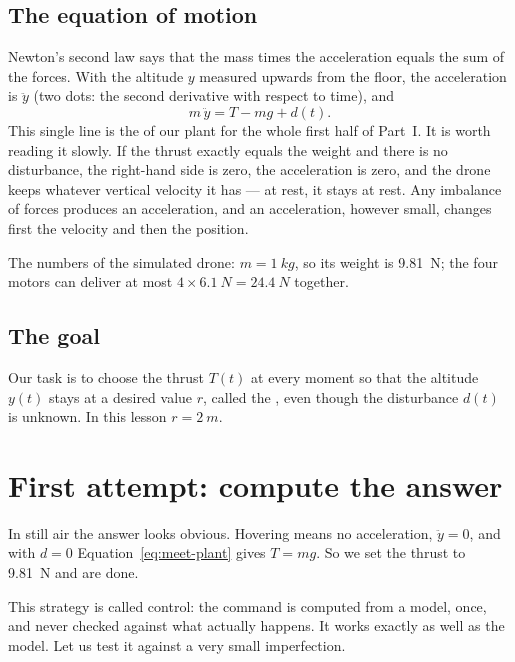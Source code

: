 \subsection{The equation of motion}
Newton's second law says that the mass times the acceleration equals the sum of the forces. With the altitude $y$ measured upwards from the floor, the acceleration is $\ddot y$ (two dots: the second derivative with respect to time), and
\begin{equation}\label{eq:meet-plant}
  m\,\ddot y = T - m g + d(t).
\end{equation}
This single line is the  of our plant for the whole first half of Part~I. It is worth reading it slowly. If the thrust exactly equals the weight and there is no disturbance, the right-hand side is zero, the acceleration is zero, and the drone keeps whatever vertical velocity it has — at rest, it stays at rest. Any imbalance of forces produces an acceleration, and an acceleration, however small, changes first the velocity and then the position.

The numbers of the simulated drone: $m = \SI{1}{kg}$, so its weight is \SI{9.81}{N}; the four motors can deliver at most $4 \times \SI{6.1}{N} = \SI{24.4}{N}$ together.

\subsection{The goal}
Our task is to choose the thrust $T(t)$ at every moment so that the altitude $y(t)$ stays at a desired value $r$, called the , even though the disturbance $d(t)$ is unknown. In this lesson $r = \SI{2}{m}$.

\section{First attempt: compute the answer}

In still air the answer looks obvious. Hovering means no acceleration, $\ddot y = 0$, and with $d = 0$ Equation~\eqref{eq:meet-plant} gives $T = mg$. So we set the thrust to \SI{9.81}{N} and are done.

This strategy is called  control: the command is computed from a model, once, and never checked against what actually happens. It works exactly as well as the model. Let us test it against a very small imperfection.

